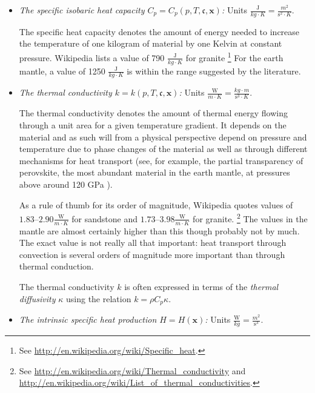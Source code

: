 \documentclass{article}
\begin{document}
\begin{itemize}
\item \textit{The specific isobaric heat capacity $C_p=C_p(p,T,\mathfrak c,\mathbf x)$:}
Units $\frac{\textrm{J}}{\si{kg}\cdot\si{K}} =
  \frac{\si{m}^2}{\textrm{s}^2\cdot\si{K}}$.

  The specific heat capacity denotes the amount of energy needed to increase
  the temperature of one kilogram of material by one Kelvin at constant pressure.
  Wikipedia lists a value of
  790 $\frac{\textrm{J}}{\si{kg}\cdot\si{K}}$ for granite%
  \footnote{See \url{http://en.wikipedia.org/wiki/Specific_heat}.}
  For the earth mantle, a value of 1250
  $\frac{\textrm{J}}{\si{kg}\cdot\si{K}}$ is within the range
  suggested by the literature.


\item \textit{The thermal conductivity $k=k(p,T,\mathfrak c,\mathbf x)$:} Units
  $\frac{\textrm{W}}{\si{m}\cdot\si{K}}=\frac{\si{kg}\cdot\si{m}}{\textrm{s}^3\cdot\si{K}}$.

  The thermal conductivity denotes the amount of thermal energy flowing
  through a unit area for a given temperature gradient. It depends on the
  material and as such will from a physical perspective depend on pressure and
  temperature due to phase changes of the material as well as through
  different mechanisms for heat transport (see, for example, the partial
  transparency of perovskite, the most abundant
  material in the earth mantle, at pressures above around 120 GPa
  \cite{BRVMFG04}).

  As a rule of thumb for its
  order of magnitude, Wikipedia quotes values of
  $1.83$--$2.90\frac{\textrm{W}}{\si{m}\cdot\si{K}}$ for sandstone and
  $1.73$--$3.98\frac{\textrm{W}}{\si{m}\cdot\si{K}}$ for granite.%
  \footnote{See \url{http://en.wikipedia.org/wiki/Thermal_conductivity} and
    \url{http://en.wikipedia.org/wiki/List_of_thermal_conductivities}.} The
  values in the mantle are almost certainly higher than this though probably
  not by much. The exact value is not really all that important: heat
  transport through convection is several orders of magnitude more important
  than through thermal conduction.

  The thermal conductivity $k$ is often expressed in terms of the
  \textit{thermal diffusivity} $\kappa$ using the relation $k = \rho C_p \kappa$.

\item \textit{The intrinsic specific heat production $H=H(\mathbf x)$:} Units
  $\frac{\textrm{W}}{\si{kg}}=\frac{\si{m}^2}{\textrm{s}^3}$.


\end{itemize}
\end{document}
